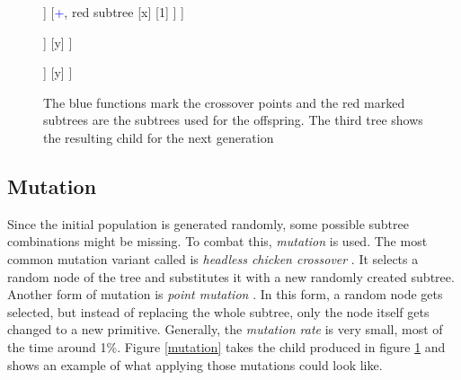\documentclass[tikz, runningheads]{llncs}
\begin{document}
\begin{figure}[h]
	\centering
	\begin{adjustbox}{valign=t}
		\begin{forest}
			[$*$
				[-
					[1]
					[y]
				]	
				[\textcolor{blue}{+}, red subtree
					[x]
					[1]
				]
			]
		\end{forest}
	\end{adjustbox}\qquad
	\begin{adjustbox}{valign=t}
		\begin{forest}
			[+, red subtree
				[\textcolor{blue}{$*$}, black subtree
					[x]
					[5]
				]
				[y]	
			]
		\end{forest}
	\end{adjustbox}\qquad
	\begin{adjustbox}{valign=t}
		\begin{forest}
			[+
				[+
					[x]
					[1]
				]
				[y]	
			]
		\end{forest}
	\end{adjustbox}
	\caption{The blue functions mark the crossover points and the red marked subtrees are the subtrees used for the 
	offspring. The third tree shows the resulting child for the next generation} \label{mating}
\end{figure}

\subsection{Mutation}
Since the initial population is generated randomly, some possible subtree combinations might be missing. 
To combat this, \textit{mutation} is used. The most common mutation variant called is
\textit{headless chicken crossover} \cite{headlessChicken}. It selects a random node of the tree and substitutes
it with a new randomly created subtree. Another form of mutation is \textit{point mutation} \cite{pointMutation}. In this form, 
a random node gets selected, but instead of replacing the whole subtree, only the node itself gets changed 
to a new primitive. Generally, the \textit{mutation rate} is very small, most of the time around 1\%. Figure \ref{mutation}
takes the child produced in figure \ref{mating} and shows an example of what applying those mutations could look like.
\end{document}
